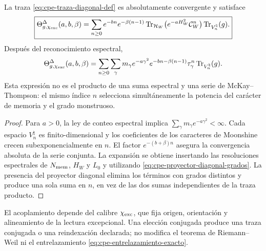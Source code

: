 \begin{theorem}
\label{thm:cpe-traza-diagonal}
La traza \eqref{eq:cpe-traza-diagonal-def} es absolutamente convergente y
satisface
\begin{equation}
 \boxed{\Theta^{\Delta}_{g,\chi_{\rm exc}}(a,b,\beta)
 =\sum_{n\ge0}e^{-bn}e^{-\beta(n-1)}
 \operatorname{Tr}_{\mathcal H_W}
 \bigl(e^{-aH_W^2}\mathcal C_W^n\bigr)
 \operatorname{Tr}_{V^\natural_n}(g).}
 \label{eq:cpe-traza-diagonal-expansion}
\end{equation}
Después del reconocimiento espectral,
\begin{equation}
 \Theta^{\Delta}_{g,\chi_{\rm exc}}(a,b,\beta)
 =\sum_{n\ge0}\sum_\gamma
 m_\gamma e^{-a\gamma^2}
 e^{-bn-\beta(n-1)}\tau_\gamma^n
 \operatorname{Tr}_{V^\natural_n}(g).
 \label{eq:cpe-traza-diagonal-espectral}
\end{equation}
Esta expresión no es el producto de una suma espectral y una serie de
McKay--Thompson: el mismo índice \(n\) selecciona simultáneamente la potencia
del carácter de memoria y el grado monstruoso.
\end{theorem}

\begin{proof}
Para \(a>0\), la ley de conteo espectral implica
\(\sum_\gamma m_\gamma e^{-a\gamma^2}<\infty\). Cada espacio
\(V^\natural_n\) es finito-dimensional y los coeficientes de los caracteres
de Moonshine crecen subexponencialmente en \(n\). El factor
\(e^{-(b+\beta)n}\) asegura la convergencia absoluta de la serie conjunta.
La expansión se obtiene insertando las resoluciones espectrales de
\(N_{\rm mem}\), \(H_W\) y \(L_0\) y utilizando
\eqref{eq:cpe-proyector-diagonal-grados}. La presencia del proyector diagonal
elimina los términos con grados distintos y produce una sola suma en
\(n\), en vez de las dos sumas independientes de la traza producto.
\end{proof}

El acoplamiento depende del calibre \(\chi_{\rm exc}\), que fija origen,
orientación y alineamiento de la lectura excepcional. Una elección conjugada
produce una traza conjugada o una reindexación declarada; no modifica el
teorema de Riemann--Weil ni el entrelazamiento
\eqref{eq:cpe-entrelazamiento-exacto}.

